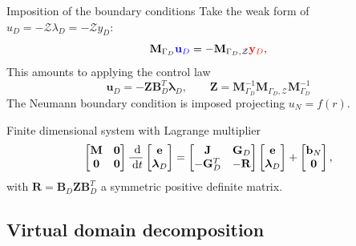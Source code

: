 \documentclass[aspectratio=169]{ISAE-Beamer}
\begin{document}
\begin{frame}{Imposition of the boundary conditions}
	Take the weak form of $u_D=-\mathcal{Z}\lambda_D=-\mathcal{Z}y_D$:
	\[ \mathbf{M}_{\Gamma_D} \textcolor{blue}{\mathbf{u}_D} = - \mathbf{M}_{\Gamma_D, \mathcal{Z}} \textcolor{red}{\mathbf{y}_D},
	\]
	This amounts to applying the control law
	\[ \mathbf{u}_D  = -\mathbf{Z} \mathbf{B}_D^T \bm{\lambda}_D, \qquad \mathbf{Z} = \mathbf{M}_{\Gamma_D}^{-1} \mathbf{M}_{\Gamma_D, \mathcal{Z}} \mathbf{M}_{\Gamma_D}^{-1}
	\]
	The Neumann boundary condition is imposed projecting $u_N = f(r)$. 
	\begin{block}{Finite dimensional system with Lagrange multiplier}
	\begin{equation*}
	\label{eq:sys_dae}
	\begin{bmatrix}
	\mathbf{M} & \mathbf{0} \\
	\mathbf{0} & \mathbf{0} \\
	\end{bmatrix} \frac{\d}{\d t}
	\begin{bmatrix}
	\mathbf{e}\\
	\bm{\lambda}_D \\
	\end{bmatrix}
	= \begin{bmatrix}
	\mathbf{J} & \mathbf{G}_D\\
	-\mathbf{G}_D^T & -\mathbf{R} \\
	\end{bmatrix}
	\begin{bmatrix}
	\mathbf{e}\\
	\bm{\lambda}_D \\
	\end{bmatrix} + \begin{bmatrix}
	\mathbf{b}_N \\
	\mathbf{0} \\
	\end{bmatrix},
	\end{equation*}
	with $\mathbf{R} = \mathbf{B}_D \mathbf{Z} \mathbf{B}_D^T$ a symmetric positive definite matrix. 
	\end{block}
	
\end{frame}

\subsection{Virtual domain decomposition}
\end{document}
